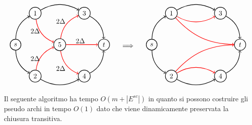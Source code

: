 \documentclass[a4paper, 11pt]{report}
\begin{document}
\[\begin{tabular}{ccc}
    \begin{tikzpicture}[node distance={18mm}, thick , main/.style = {draw, circle}] 
    
    \node[main] (0) {$s$};
    \node[main] (1) at (1, 1.6) {1};
    \node[main] (2) at (1, -1.6) {2};
    \node[main] (3) at (3.5, 1.6) {3};
    \node[main] (4) at (3.5, -1.6) {4};
    \node[main] (6) at (2.25,0) {5};
    \node[main] (5) at (4.5, 0) {$t$};

    \draw[->] (0)[bend left] to (1);
    \draw[->] (0)[bend right] to (2);
    \draw[->] (1)[bend left] to (3);
    \draw[->] (2)[bend right] to (4);
    \draw[->] (4)[bend right] to (5);
    \draw[->] (3)[bend left] to (5);

    \draw[->] (1)[red, bend right] to (6);
    \draw[->] (6)[red, bend right] to (4);
    \draw[->] (6)[red, bend left] to (3);
    \draw[->] (2)[red, bend left] to (6);
    \draw[->] (6) [red] to (5);

    \node at (3.3,0.2) {$2\Delta$};
    \node at (2.3,1.2) {$2\Delta$};
    \node at (2.3,-1.2) {$2\Delta$};

    \node at (1,.7) {$2\Delta$};
    \node at (1,-.7) {$2\Delta$};
    

\end{tikzpicture}&\begin{tikzpicture}
    \node {$\implies$};%
    \node at (0,1.4) {};
    \node at (0,-1.95) {};
\end{tikzpicture}  &
\begin{tikzpicture}[node distance={19mm}, thick , main/.style = {draw, circle}] 
    \node[main] (0) {$s$};
    \node[main] (1) at (1, 1.6) {1};
    \node[main] (2) at (1, -1.6) {2};
    \node[main] (3) at (3.5, 1.6) {3};
    \node[main] (4) at (3.5, -1.6) {4};
    \node[main] (5) at (4.5, 0) {$t$};

    \draw[->] (0)[bend left] to (1);
    \draw[->] (0)[bend right] to (2);
    \draw[->] (1)[bend left] to (3);
    \draw[->] (2)[bend right] to (4);
    \draw[->] (4)[bend right] to (5);
    \draw[->] (3)[bend left] to (5);

    \draw[->] (1)[red, bend right] to (3);
    \draw[->] (2)[red, bend left] to (4);
    \draw[->] (2)[red, bend left = 23] to (5);
    \draw[->] (1)[red, bend right = 23] to (5);


\end{tikzpicture}
\end{tabular}\]
 Il seguente algoritmo ha tempo $O(m + |E^{sc}|)$ in quanto si possono costruire gli pseudo archi in tempo $O(1)$ dato che viene dinamicamente preservata la chiusura transitiva. 
\end{document}
